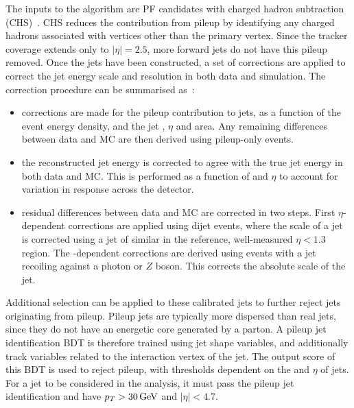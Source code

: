 The inputs to the \akt algorithm are PF candidates with charged hadron subtraction (CHS)~\cite{JEC}. 
CHS reduces the contribution from pileup by identifying any charged hadrons associated with vertices other than the primary vertex.
Since the tracker coverage extends only to $|\eta|=2.5$, more forward jets do not have this pileup removed.
Once the jets have been constructed, a set of corrections are applied to correct the jet energy scale and resolution in both data and simulation.
The correction procedure can be summarised as~\cite{JEC}:
\begin{itemize}
  \item corrections are made for the pileup contribution to jets, as a function of the event energy density, 
        and the jet \pt, $\eta$ and area.
        Any remaining differences between data and MC are then derived using pileup-only events.
  \item the reconstructed jet energy is corrected to agree with the true jet energy in both data and MC.
        This is performed as a function of \pt and $\eta$ to account for variation in response across the detector.
  \item residual differences between data and MC are corrected in two steps.
        First $\eta$-dependent corrections are applied using dijet events, 
        where the scale of a jet is corrected using a jet of similar \pt in the reference, well-measured $\eta < 1.3$ region.
        The \pt-dependent corrections are derived using events with a jet recoiling against a photon or $Z$ boson.
        This corrects the absolute scale of the jet.
\end{itemize}

Additional selection can be applied to these calibrated jets to further reject jets originating from pileup.
Pileup jets are typically more dispersed than real jets, since they do not have an energetic core generated by a parton.
A pileup jet identification BDT is therefore trained using jet shape variables, 
and additionally track variables related to the interaction vertex of the jet.
The output score of this BDT is used to reject pileup, with thresholds dependent on the \pt and $\eta$ of jets.
For a jet to be considered in the analysis, it must pass the pileup jet identification and have $p_T > \SI{30}{GeV}$ and $|\eta| < 4.7$.

